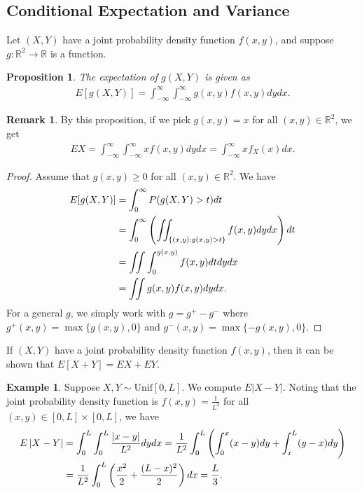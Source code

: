 \documentclass[15pt,a4paper]{book}
\newtheorem{proposition}[theorem]{Proposition}
\theoremstyle{definition}
\newtheorem{example}[theorem]{Example}
\newtheorem{remark}[theorem]{Remark}
\newcommand{\abs}[1]{\left| #1 \right|} %
\newcommand{\R}{\mathbb{R}}
\begin{document}
\subsection{Conditional Expectation and Variance}
Let $(X,Y)$ have a joint probability density function $f(x,y)$, and suppose $g:\R^{2} \to \R$ is a function.
\begin{proposition}
    The expectation of $g(X,Y)$ is given as
    \begin{align*}
        E[g(X,Y)] = \int_{-\infty}^{\infty} \int_{-\infty}^{\infty} g(x,y) f(x,y) dy dx.
    \end{align*}
\end{proposition}
\begin{remark}
    By this proposition, if we pick $g(x,y) = x$ for all $(x,y) \in \R^{2}$, we get
    \begin{align*}
        EX = \int_{-\infty}^{\infty} \int_{-\infty}^{\infty} x f(x,y) dy dx = \int_{-\infty}^{\infty} x f_{X}(x)dx.
    \end{align*}
\end{remark}
\begin{proof}
    Assume that $g(x,y) \geq 0$ for all $(x,y) \in \R^{2}$. We have
    \begin{align}
        E[g(X,Y)] &= \int_{0}^{\infty} P(g(X,Y) > t) dt \notag \\
        &= \int_{0}^{\infty} \left( \iint_{\{(x,y) : g(x,y) > t\}} f(x,y) dy dx \right)dt \notag \\
        &= \iint \int_{0}^{g(x,y)} f(x,y) dt dy dx \notag \\
        &= \iint g(x,y)f(x,y) dy dx.
    \end{align}
    For a general $g$, we simply work with $g = g^{+} - g^{-}$ where $g^{+}(x,y) = \max \{g(x,y),0\}$ and $g^{-}(x,y) = \max \{-g(x,y),0\}$.
\end{proof}
If $(X,Y)$ have a joint probability density function $f(x,y)$, then it can be shown that $E[X+Y] = EX + EY$.

\begin{example}
    Suppose $X,Y \sim \text{Unif}[0,L]$. We compute $E\abs{X-Y}$. Noting that the joint probability density function is $f(x,y) = \frac{1}{L^{2}}$ for all $(x,y) \in [0,L] \times [0,L]$, we have
    \begin{align}
        E\abs{X-Y} &= \int_{0}^{L} \int_{0}^{L} \frac{\abs{x-y}}{L^2} dy dx \notag
        = \frac{1}{L^{2}} \int_{0}^{L} \left( \int_{0}^{x}(x-y)dy + \int_{x}^{L} (y-x)dy \right) \\
        &= \frac{1}{L^{2}} \int_{0}^{L} \left( \frac{x^{2}}{2} + \frac{(L-x)^{2}}{2} \right)dx = \frac{L}{3}.
    \end{align}
\end{example}
\end{document}
